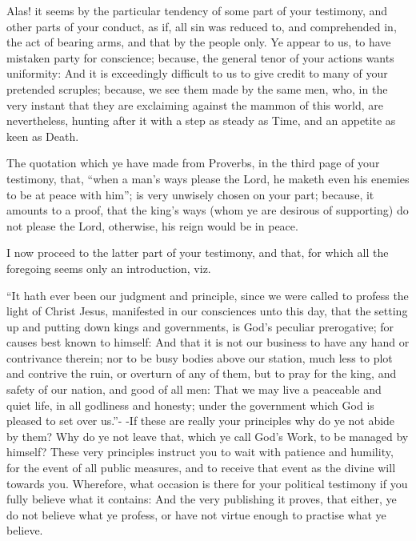 \documentclass[12pt,oneside]{memoir}
\begin{document}
Alas! it seems by the particular tendency of some part of your
testimony, and other parts of your conduct, as if, all sin was
reduced to, and comprehended in, the act of bearing arms, and that
by the people only. Ye appear to us, to have mistaken party for
conscience; because, the general tenor of your actions wants
uniformity: And it is exceedingly difficult to us to give credit to
many of your pretended scruples; because, we see them made by the
same men, who, in the very instant that they are exclaiming against
the mammon of this world, are nevertheless, hunting after it with a
step as steady as Time, and an appetite as keen as Death.

The quotation which ye have made from Proverbs, in the third page of
your testimony, that, ``when a man's ways please the Lord, he maketh
even his enemies to be at peace with him''; is very unwisely chosen
on your part; because, it amounts to a proof, that the king's ways
(whom ye are desirous of supporting) do not please the Lord,
otherwise, his reign would be in peace.

I now proceed to the latter part of your testimony, and that, for
which all the foregoing seems only an introduction, viz.

``It hath ever been our judgment and principle, since we were called
to profess the light of Christ Jesus, manifested in our consciences
unto this day, that the setting up and putting down kings and
governments, is God's peculiar prerogative; for causes best known to
himself: And that it is not our business to have any hand or
contrivance therein; nor to be busy bodies above our station, much
less to plot and contrive the ruin, or overturn of any of them, but
to pray for the king, and safety of our nation, and good of all men:
That we may live a peaceable and quiet life, in all godliness and
honesty; under the government which God is pleased to set over us.''-
-If these are really your principles why do ye not abide by them?
Why do ye not leave that, which ye call God's Work, to be managed by
himself? These very principles instruct you to wait with patience
and humility, for the event of all public measures, and to receive
that event as the divine will towards you. Wherefore, what occasion
is there for your political testimony if you fully believe what it
contains: And the very publishing it proves, that either, ye do not
believe what ye profess, or have not virtue enough to practise what
ye believe.
\end{document}
